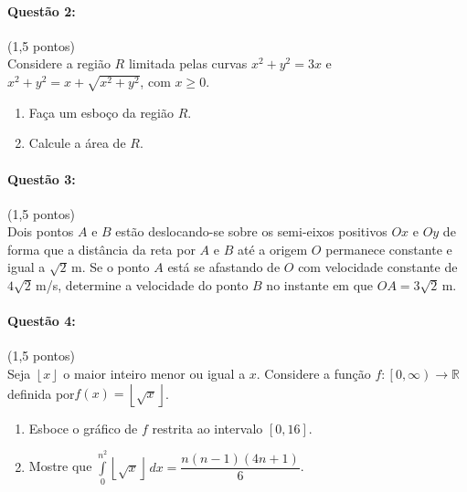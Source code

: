\documentclass[12pt,a4paper]{article}
\begin{document}
\paragraph{Questão 2:}(1,5 pontos)\\
Considere a região $R$ limitada pelas curvas $x^2+y^2=3x$ e $x^2+y^2=x+\sqrt{x^2+y^2}$, com $x \geq 0$.

\begin{enumerate}[label=(\alph*)]
\item Faça um esboço da região $R$.

\item Calcule a área de $R$.

\end{enumerate}

\paragraph{Questão 3:}(1,5 pontos)\\
Dois pontos $A$ e $B$ estão deslocando-se sobre os semi-eixos positivos $Ox$ e $Oy$ de forma que a distância da reta por $A$ e $B$ até a origem $O$ permanece constante e igual a $\sqrt{2}\,$m. Se o ponto $A$ está se afastando de $O$ com velocidade constante de $4\sqrt{2}\,$m/s, determine a velocidade do ponto $B$ no instante em que $OA=3\sqrt{2}\,$m.

\paragraph{Questão 4:}(1,5 pontos)\\
Seja $\left \lfloor x \right \rfloor$ o maior inteiro menor ou igual a $x$. Considere a função $f:\left [  0,\infty  \right )  \to \mathbb{R}$ definida por$f(x)=\left \lfloor \sqrt{x} \right \rfloor$.

\begin{enumerate}[label=(\alph*)]
\item Esboce o gráfico de $f$ restrita ao intervalo $\left [ 0,16 \right ]$.

\item Mostre que $\displaystyle\int\limits_{0}^{n^2}\left \lfloor \sqrt{x} \right \rfloor\,dx=\dfrac{n(n-1)(4n+1)}{6}$.

\end{enumerate}
\end{document}
